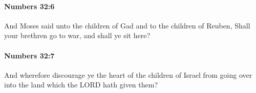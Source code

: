 		\paragraph{Numbers 32:6} %
			\label{NUMBERS-32-6}

			And Moses said unto the children of Gad and to the children of Reuben, Shall your brethren go to war, and shall ye sit here?


		\paragraph{Numbers 32:7} %
			\label{NUMBERS-32-7}

			And wherefore discourage ye the heart of the children of Israel from going over into the land which the LORD hath given them?


